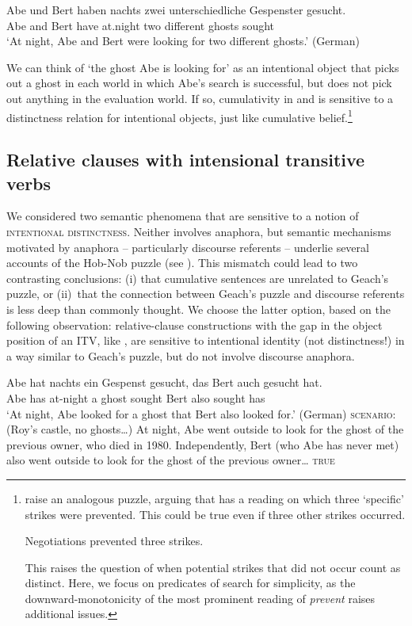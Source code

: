 \documentclass[output=paper]{langscibook}
\begin{document}
\ea \label{sch-has:ex:17} \gll Abe und Bert haben nachts zwei unterschiedliche Gespenster gesucht.\\
Abe and Bert have at.night two different ghosts sought\\
\glt `At night, Abe and Bert were looking for two different ghosts.' \hfill (German) \z

\noindent We can think of `the ghost Abe is looking for' as an intentional object that picks out a ghost in each world in which Abe's search is successful, but does not pick out anything in the evaluation world. If so, cumulativity in  and  is sensitive to a distinctness relation for intentional objects, just like cumulative belief.\footnote{ \citet{Condoravdi:2001} raise an analogous puzzle, arguing that  has a reading on which three `specific' strikes were prevented. This could be true even if three other strikes occurred. 

\ea \label{sch-has:ex:13} Negotiations prevented three strikes. \hfill \citep[(2)]{Condoravdi:2001}\z

\noindent This raises the question of when potential strikes that did not occur count as distinct. Here, we focus on predicates of search for simplicity, as the downward-monotonicity of the most prominent reading of \textit{prevent} raises additional issues.}

\subsection{Relative clauses with intensional transitive verbs}

We considered two semantic phenomena that are sensitive to a notion of \textsc{intentional distinctness}. Neither involves anaphora, but semantic mechanisms motivated by anaphora -- particularly discourse referents -- underlie several accounts of the Hob-Nob puzzle (see ). This mismatch could lead to two  contrasting conclusions: (i) that cumulative sentences are unrelated to Geach's puzzle, or (ii)~that the connection between Geach's puzzle and discourse referents is less deep than commonly thought. We choose the latter option, based on the following observation: relative-clause constructions with the gap in the object position of an ITV, like , are sensitive to intentional identity (not distinctness!) in a way similar to Geach's puzzle, but do not involve discourse anaphora.

\eanoraggedright
\eanoraggedright \label{sch-has:ex:14} {\gll Abe hat nachts ein Gespenst gesucht, das Bert auch gesucht hat. \\
Abe has at-night a ghost sought \REL{} Bert also sought has \\
\glt `At night, Abe looked for a ghost that Bert also looked for.'} \hfill (German)
\ex \label{sch-has:ex:15} \textsc{scenario:} (Roy's castle, no ghosts\ldots) At night, Abe went outside to look for the ghost of the previous owner, who died in 1980. Independently, Bert (who Abe has never met) also went outside to look for the ghost of the previous owner\ldots \hfill {} \textsc{true}
\z\z
\end{document}
